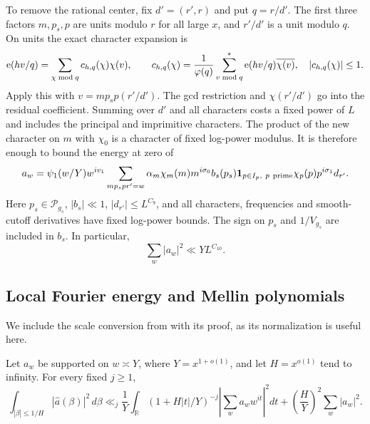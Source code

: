 To remove the rational center, fix $d'=(r',r)$ and put $q=r/d'$.
The first three factors $m,p_s,p$ are units modulo $r$ for all
large $x$, and $r'/d'$ is a unit modulo $q$.  On units the exact
character expansion is
\begin{equation}\label{sh:rational-characters}
 \mathrm{e}(hv/q)=\sum_{\chi\bmod q}c_{h,q}(\chi)\chi(v),\qquad
 c_{h,q}(\chi)=\frac1{\varphi(q)}
       \sum_{v\bmod q}^{*}\mathrm{e}(hv/q)\overline{\chi(v)},
 \quad |c_{h,q}(\chi)|\leq1.
\end{equation}
Apply this with $v=mp_sp(r'/d')$.  The gcd restriction and
$\chi(r'/d')$ go into the residual coefficient.  Summing over
$d'$ and all characters costs a fixed power of $L$ and includes
the principal and imprimitive characters.  The product of the new
character on $m$ with $\chi_0$ is a character of fixed log-power
modulus.  It is therefore enough to bound the energy at zero of
\begin{equation}\label{sh:four-factors}
 a_w=\psi_1(w/Y)w^{iv_1}
       \sum_{mp_sp r'=w}\alpha_m\chi_m(m)m^{i\sigma_0}
       b_s(p_s)\mathbf{1}_{p\in I_p,\ p\ {\rm prime}}
       \chi_p(p)p^{i\sigma_1}d_{r'}.
\end{equation}
Here $p_s\in\mathcal P_{g_s}$, $|b_s|\ll1$,
$|d_{r'}|\leq L^{C_9}$, and all characters, frequencies and
smooth-cutoff derivatives have fixed log-power bounds.  The sign
on $p_s$ and $1/V_{g_s}$ are included in $b_s$.  In particular,
\begin{equation}\label{sh:a-norm}
 \sum_w|a_w|^2\ll YL^{C_{10}}.
\end{equation}

\subsection{Local Fourier energy and Mellin polynomials}

We include the scale conversion from
\cite[Section~5, equation~(5.16)]{SmoothShifted} with its proof,
as its normalization is useful here.

\begin{lemma}\label{sh:mellin-energy}
Let $a_w$ be supported on $w\asymp Y$, where $Y=x^{1+o(1)}$,
and let $H=x^{o(1)}$ tend to infinity.  For every fixed $j\geq1$,
\begin{equation}\label{sh:mellin-inequality}
 \int_{|\beta|\leq1/H}|\widehat a(\beta)|^2\,d\beta
 \ll_j \frac1Y\int_{\mathbb R}(1+H|t|/Y)^{-j}
           \left|\sum_w a_ww^{it}\right|^2dt
       +\left(\frac HY\right)^2\sum_w|a_w|^2.
\end{equation}
\end{lemma}

